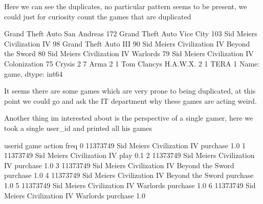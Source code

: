 \documentclass[letterpaper,10pt,english]{jupyterBook}
\begin{document}
\sphinxAtStartPar
Here we can see the duplicates, no particular pattern seems to be present, we could just for curiosity count the games that are duplicated

\begin{sphinxVerbatim}[commandchars=\\\{\}]
\PYG{p}{[}\PYG{p}{]}
\end{sphinxVerbatim}

\begin{sphinxVerbatim}[commandchars=\\\{\}]
Grand Theft Auto San Andreas                    172
Grand Theft Auto Vice City                      103
Sid Meier\PYGZsq{}s Civilization IV                      98
Grand Theft Auto III                             90
Sid Meier\PYGZsq{}s Civilization IV Beyond the Sword     80
Sid Meier\PYGZsq{}s Civilization IV Warlords             79
Sid Meier\PYGZsq{}s Civilization IV Colonization         75
Crysis 2                                          7
Arma 2                                            1
Tom Clancy\PYGZsq{}s H.A.W.X. 2                           1
TERA                                              1
Name: game, dtype: int64
\end{sphinxVerbatim}

\sphinxAtStartPar
It seems there are some games which are very prone to being duplicated, at this point we could go and ask the IT department why these games are acting weird.

\sphinxAtStartPar
Another thing im interested about is the perspective of a single gamer, here we took a single user\_id and printed all his games

\begin{sphinxVerbatim}[commandchars=\\\{\}]
\PYG{p}{[}  \PYG{p}{]}
\end{sphinxVerbatim}

\begin{sphinxVerbatim}[commandchars=\\\{\}]
    user\PYGZus{}id                                          game    action  freq
0  11373749                   Sid Meier\PYGZsq{}s Civilization IV  purchase   1.0
1  11373749                   Sid Meier\PYGZsq{}s Civilization IV      play   0.1
2  11373749                   Sid Meier\PYGZsq{}s Civilization IV  purchase   1.0
3  11373749  Sid Meier\PYGZsq{}s Civilization IV Beyond the Sword  purchase   1.0
4  11373749  Sid Meier\PYGZsq{}s Civilization IV Beyond the Sword  purchase   1.0
5  11373749          Sid Meier\PYGZsq{}s Civilization IV Warlords  purchase   1.0
6  11373749          Sid Meier\PYGZsq{}s Civilization IV Warlords  purchase   1.0
\end{sphinxVerbatim}
\end{document}
